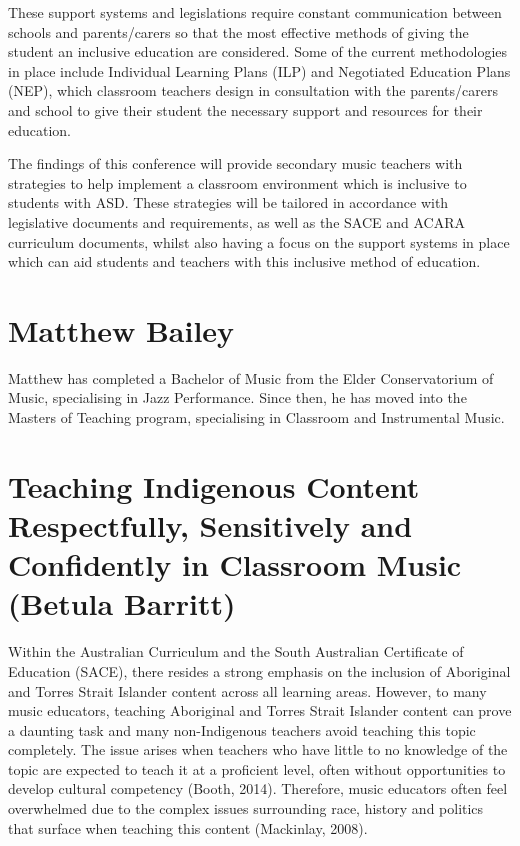 \documentclass[twoside,12pt,a4paper,notitlepage]{memoir}
\begin{document}
These support systems and legislations require constant communication between schools and parents/carers so that the most effective methods of giving the student an inclusive education are considered. Some of the current methodologies in place include Individual Learning Plans (ILP) and Negotiated Education Plans (NEP), which classroom teachers design in consultation with the parents/carers and school to give their student the necessary support and resources for their education.

The findings of this conference will provide secondary music teachers with strategies to help implement a classroom environment which is inclusive to students with ASD. These strategies will be tailored in accordance with legislative documents and requirements, as well as the SACE and ACARA curriculum documents, whilst also having a focus on the support systems in place which can aid students and teachers with this inclusive method of education.

\section*{Matthew Bailey}

Matthew has completed a Bachelor of Music from the Elder Conservatorium of Music, specialising in Jazz Performance. Since then, he has moved into the Masters of Teaching program, specialising in Classroom and Instrumental Music.


\pagebreak
\section*{Teaching Indigenous Content Respectfully, Sensitively and Confidently in Classroom Music (Betula Barritt)}
\label{aut:barritt}

Within the Australian Curriculum and the South Australian Certificate of Education (SACE), there resides a strong emphasis on the inclusion of Aboriginal and Torres Strait Islander content across all learning areas. However, to many music educators, teaching Aboriginal and Torres Strait Islander content can prove a daunting task and many non-Indigenous teachers avoid teaching this topic completely. The issue arises when teachers who have little to no knowledge of the topic are expected to teach it at a proficient level, often without opportunities to develop cultural competency (Booth, 2014). Therefore, music educators often feel overwhelmed due to the complex issues surrounding race, history and politics that surface when teaching this content (Mackinlay, 2008).
\end{document}
